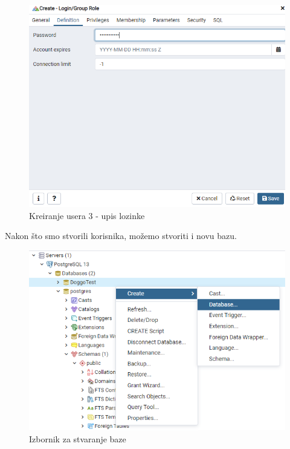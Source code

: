         			 \begin{figure}[H]
        				\includegraphics[scale=0.6]{slike/deploy_kreiranje_usera3.PNG} 
        				\centering
        				\caption{Kreiranje usera 3 - upis lozinke}
        				\label{fig:sustav-prvi-slucaj}
        			\end{figure}
                
                Nakon što smo stvorili korisnika, možemo stvoriti i novu bazu.
                
                    \begin{figure}[H]
        				\includegraphics[scale=0.6]{slike/deploy_kreiranje_baze1.PNG} 
        				\centering
        				\caption{Izbornik za stvaranje baze}
        				\label{fig:sustav-prvi-slucaj}
        			\end{figure}
        			
